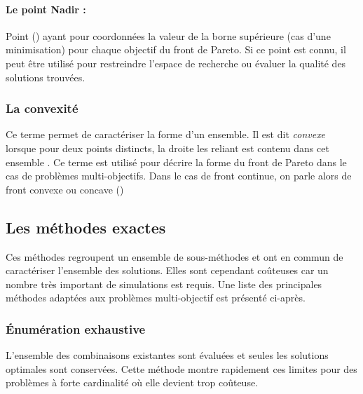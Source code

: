 \paragraph{Le point Nadir :} %
\label{par:le_point_nadir}
Point () ayant pour coordonnées la
valeur de la borne supérieure (cas d’une minimisation) pour chaque objectif du front
de Pareto. Si ce point est connu, il peut être utilisé pour restreindre l’espace
de recherche ou évaluer la qualité des solutions trouvées.



\subsubsection{La convexité} %
\label{ssub:la_convexite}
Ce terme permet de caractériser la forme d’un ensemble.
Il est dit \emph{convexe} lorsque pour deux points distincts, la droite les reliant
est contenu dans cet ensemble \parencite{Collette2002}. Ce terme est utilisé pour décrire
la forme du front de Pareto dans le cas de problèmes multi-objectifs. Dans le cas
de front continue, on parle alors de front convexe ou concave ()



\subsection{Les méthodes exactes} %
\label{sub:les_methodes_exactes}
Ces méthodes regroupent un ensemble de sous-méthodes et ont en commun de caractériser
l’ensemble des solutions. Elles sont cependant coûteuses car un nombre très important
de simulations est requis. Une liste des principales méthodes adaptées aux problèmes
multi-objectif est présenté ci-après.


\subsubsection{Énumération exhaustive} %
\label{ssub:enumeration_exhaustive}
L’ensemble des combinaisons existantes sont évaluées et seules les solutions optimales
sont conservées. Cette méthode montre rapidement ces limites pour des problèmes à
forte cardinalité où elle devient trop coûteuse.


